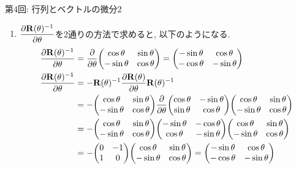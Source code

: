 \documentclass[dvipdfmx,notheorems,t]{beamer}
\begin{document}
\begin{frame}{第4回: 行列とベクトルの微分2}
\begin{enumerate}
  \item $\displaystyle \pdv{\vb{R}(\theta)^{-1}}{\theta}$を2通りの方法で求めると, 以下のようになる.
  \begin{align*}
    \pdv{\vb{R}(\theta)^{-1}}{\theta}
      &= \pdv{\theta} \mqty(\cos \theta & \sin \theta \\ -\sin \theta & \cos \theta)
      = \mqty(-\sin \theta & \cos \theta \\ -\cos \theta & -\sin \theta) \\
    \pdv{\vb{R}(\theta)^{-1}}{\theta}
      &= - \vb{R}(\theta)^{-1} \pdv{\vb{R}(\theta)}{\theta} \vb{R}(\theta)^{-1} \\
      &= - \mqty(\cos \theta & \sin \theta \\ -\sin \theta & \cos \theta)
        \pdv{\theta} \mqty(\cos \theta & -\sin \theta \\ \sin \theta & \cos \theta)
        \mqty(\cos \theta & \sin \theta \\ -\sin \theta & \cos \theta) \\
      &= - \mqty(\cos \theta & \sin \theta \\ -\sin \theta & \cos \theta)
        \mqty(-\sin \theta & -\cos \theta \\ \cos \theta & -\sin \theta)
        \mqty(\cos \theta & \sin \theta \\ -\sin \theta & \cos \theta) \\
      &= - \mqty(0 & -1 \\ 1 & 0) \mqty(\cos \theta & \sin \theta \\ -\sin \theta & \cos \theta)
      = \mqty(-\sin \theta & \cos \theta \\ -\cos \theta & -\sin \theta)
  \end{align*}
\end{enumerate}
\end{frame}
\end{document}
